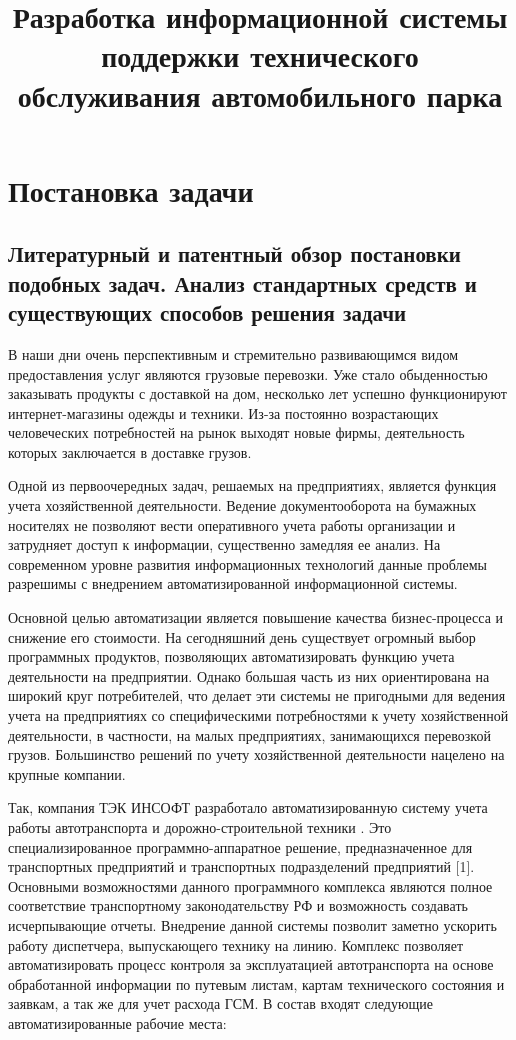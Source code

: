 \documentclass{lstu-diploma}
\title{Разработка информационной системы поддержки технического обслуживания автомобильного парка}
\begin{document}
\maketitle

\tableofcontents

\chapter{Постановка задачи}

\section{Литературный и патентный обзор постановки подобных задач.
Анализ стандартных средств и существующих способов решения задачи}

В наши дни очень перспективным и стремительно развивающимся видом предоставления
услуг являются грузовые перевозки.
Уже стало обыденностью заказывать продукты с доставкой на дом, несколько лет
успешно функционируют интернет-магазины одежды и техники.
Из-за постоянно возрастающих человеческих потребностей на рынок выходят новые
фирмы, деятельность которых заключается в доставке грузов.

Одной из первоочередных задач, решаемых на предприятиях, является функция
учета хозяйственной деятельности.
Ведение документооборота на бумажных носителях не позволяют вести оперативного
учета работы организации и затрудняет доступ к информации, существенно замедляя
ее анализ.
На современном уровне развития информационных технологий данные проблемы
разрешимы с внедрением автоматизированной информационной системы.

Основной целью автоматизации является повышение качества бизнес-процесса и
снижение его стоимости.
На сегодняшний день существует огромный выбор программных продуктов, позволяющих
автоматизировать функцию учета деятельности на предприятии.
Однако большая часть из них ориентирована на широкий круг потребителей, что
делает эти системы не пригодными для ведения учета на предприятиях со
специфическими потребностями к учету хозяйственной деятельности,
в частности, на малых предприятиях, занимающихся перевозкой грузов.
Большинство решений по учету хозяйственной деятельности нацелено на крупные
компании.

Так, компания ТЭК ИНСОФТ разработало автоматизированную систему учета работы
автотранспорта и дорожно-строительной техники . Это специализированное
программно-аппаратное решение, предназначенное для транспортных предприятий и
транспортных подразделений предприятий [1].
Основными возможностями данного программного комплекса являются полное
соответствие транспортному законодательству РФ и возможность создавать
исчерпывающие отчеты.
Внедрение данной системы позволит заметно ускорить работу диспетчера,
выпускающего технику на линию.
Комплекс позволяет автоматизировать процесс контроля за эксплуатацией
автотранспорта на основе обработанной информации по путевым листам, картам
технического состояния и заявкам, а так же для учет расхода ГСМ.
В состав  входят следующие автоматизированные рабочие места:
\end{document}

